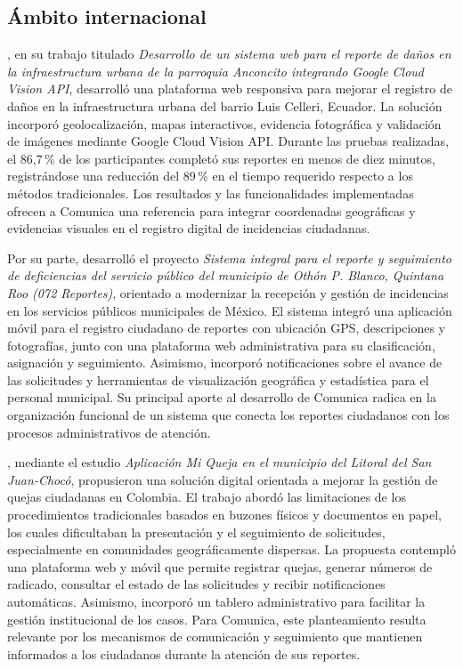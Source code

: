\subsection{Ámbito internacional}

\textcite{parrales2025desarrollo}, en su trabajo titulado \textit{Desarrollo de un sistema web para el reporte de daños en la infraestructura urbana de la parroquia Anconcito integrando Google Cloud Vision API}, desarrolló una plataforma web responsiva para mejorar el registro de daños en la infraestructura urbana del barrio Luis Celleri, Ecuador. La solución incorporó geolocalización, mapas interactivos, evidencia fotográfica y validación de imágenes mediante Google Cloud Vision API. Durante las pruebas realizadas, el 86,7\,\% de los participantes completó sus reportes en menos de diez minutos, registrándose una reducción del 89\,\% en el tiempo requerido respecto a los métodos tradicionales. Los resultados y las funcionalidades implementadas ofrecen a Comunica una referencia para integrar coordenadas geográficas y evidencias visuales en el registro digital de incidencias ciudadanas.

Por su parte, \textcite{trejo2019sistema} desarrolló el proyecto \textit{Sistema integral para el reporte y seguimiento de deficiencias del servicio público del municipio de Othón P. Blanco, Quintana Roo (072 Reportes)}, orientado a modernizar la recepción y gestión de incidencias en los servicios públicos municipales de México. El sistema integró una aplicación móvil para el registro ciudadano de reportes con ubicación GPS, descripciones y fotografías, junto con una plataforma web administrativa para su clasificación, asignación y seguimiento. Asimismo, incorporó notificaciones sobre el avance de las solicitudes y herramientas de visualización geográfica y estadística para el personal municipal. Su principal aporte al desarrollo de Comunica radica en la organización funcional de un sistema que conecta los reportes ciudadanos con los procesos administrativos de atención.

\textcite{murillo2025aplicacion}, mediante el estudio \textit{Aplicación Mi Queja en el municipio del Litoral del San Juan-Chocó}, propusieron una solución digital orientada a mejorar la gestión de quejas ciudadanas en Colombia. El trabajo abordó las limitaciones de los procedimientos tradicionales basados en buzones físicos y documentos en papel, los cuales dificultaban la presentación y el seguimiento de solicitudes, especialmente en comunidades geográficamente dispersas. La propuesta contempló una plataforma web y móvil que permite registrar quejas, generar números de radicado, consultar el estado de las solicitudes y recibir notificaciones automáticas. Asimismo, incorporó un tablero administrativo para facilitar la gestión institucional de los casos. Para Comunica, este planteamiento resulta relevante por los mecanismos de comunicación y seguimiento que mantienen informados a los ciudadanos durante la atención de sus reportes.

